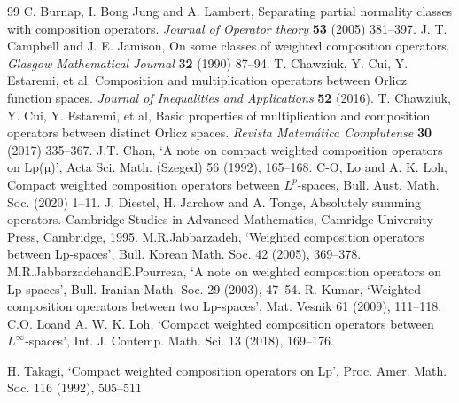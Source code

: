 \documentclass{amsart}
\theoremstyle{definition}\newtheorem{defn}[thm]{Definition}
\theoremstyle{remark}
\numberwithin{equation}{section}
\begin{document}
\begin{thebibliography}{99}
 C. Burnap, I. Bong Jung and A. Lambert, Separating partial normality classes with composition operators. {\it Journal of Operator theory} {\bf 53} (2005) 381--397.
 J. T. Campbell and J. E. Jamison, On some classes of weighted composition operators. {\it Glasgow Mathematical Journal} {\bf32} (1990) 87--94.
 T. Chawziuk, Y. Cui, Y. Estaremi, et al. Composition and multiplication operators between Orlicz function spaces. {\it Journal of Inequalities and Applications} {\bf 52} (2016).
 T. Chawziuk, Y. Cui, Y. Estaremi, et al, Basic properties of multiplication and composition operators between distinct Orlicz spaces. {\it Revista Matemática Complutense} {\bf 30} (2017) 335--367.
 J.T. Chan, ‘A note on compact weighted composition operators on Lp(µ)’, Acta Sci. Math. (Szeged)
56 (1992), 165–168.
 C-O, Lo and A. K. Loh, Compact weighted composition operators between $L^p$-spaces, Bull. Aust. Math. Soc. (2020) 1--11.
 J. Diestel, H. Jarchow and A. Tonge, Absolutely summing operators. Cambridge Studies in Advanced Mathematics, Camridge University Press, Cambridge, 1995.
 M.R.Jabbarzadeh, ‘Weighted composition operators between Lp-spaces’, Bull. Korean Math. Soc.
42 (2005), 369–378.
 M.R.JabbarzadehandE.Pourreza, ‘A note on weighted composition operators on Lp-spaces’, Bull.
Iranian Math. Soc. 29 (2003), 47–54.
 R. Kumar, ‘Weighted composition operators between two Lp-spaces’, Mat. Vesnik 61 (2009),
111–118.
 C.O. Loand A. W. K. Loh, ‘Compact weighted composition operators between $L^{\infty}$-spaces’, Int. J.
Contemp. Math. Sci. 13 (2018), 169–176.

 H. Takagi, ‘Compact weighted composition operators on Lp’, Proc. Amer. Math. Soc. 116 (1992),
505–511    

\end{thebibliography}
\end{document}
